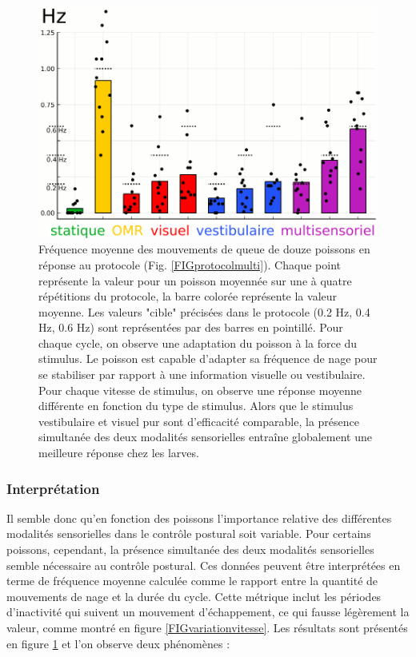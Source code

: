 \begin{figure}
    \centering
    \includegraphics[width=\textwidth]{./files/stats3.svg.png}
    \caption{
    Fréquence moyenne des mouvements de queue de douze poissons en réponse au protocole (Fig. \ref{FIGprotocolmulti}). Chaque point représente la valeur pour un poisson moyennée sur une à quatre répétitions du protocole, la barre colorée représente la valeur moyenne. Les valeurs "cible" précisées dans le protocole (0.2 Hz, 0.4 Hz, 0.6 Hz) sont représentées par des barres en pointillé. Pour chaque cycle, on observe une adaptation du poisson à la force du stimulus. Le poisson est capable d'adapter sa fréquence de nage pour se stabiliser par rapport à une information visuelle ou vestibulaire. Pour chaque vitesse de stimulus, on observe une réponse moyenne différente en fonction du type de stimulus. Alors que le stimulus vestibulaire et visuel pur sont d'efficacité comparable, la présence simultanée des deux modalités sensorielles entraîne globalement une meilleure réponse chez les larves.
    \label{FIGstatsmultimodal}}
    \end{figure}

\subsubsection{Interprétation}

Il semble donc qu'en fonction des poissons l'importance relative des différentes modalités sensorielles dans le contrôle postural soit variable. Pour certains poissons, cependant, la présence simultanée des deux modalités sensorielles semble nécessaire au contrôle postural. Ces données peuvent être interprétées en terme de fréquence moyenne calculée comme le rapport entre la quantité de mouvements de nage et la durée du cycle. Cette métrique inclut les périodes d'inactivité qui suivent un mouvement d'échappement, ce qui fausse légèrement la valeur, comme montré en figure \ref{FIGvariationvitesse}. Les résultats sont présentés en figure \ref{FIGstatsmultimodal} et l'on observe deux phénomènes :

